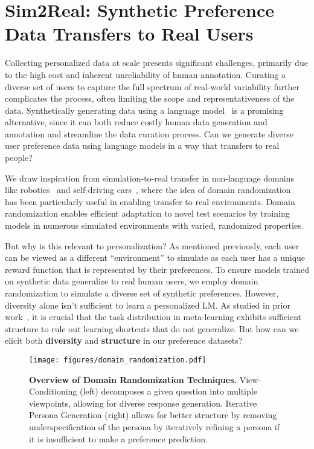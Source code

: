 
\vspace{-0.15cm}
\section{Sim2Real: Synthetic Preference Data Transfers to Real Users}
\vspace{-0.15cm}
\label{sec:dom_rand}

Collecting personalized data at scale presents significant challenges, primarily due to the high cost and inherent unreliability of human annotation. Curating a diverse set of users to capture the full spectrum of real-world variability further complicates the process, often limiting the scope and representativeness of the data. Synthetically generating data using a language model~\citep{li2024syntheticdataalmostscratch,bai2022constitutionalaiharmlessnessai} is a promising alternative, since it can both reduce costly human data generation and annotation and streamline the data curation process. Can we generate diverse user preference data using language models in a way that transfers to real people?

We draw inspiration from simulation-to-real transfer in non-language domains like robotics~\citep{makoviychuk2021isaacgymhighperformance} and self-driving cars~\citep{yang2023unisimneuralclosedloopsensor}, where the idea of domain randomization~\citep{tobin2018domainrandomizationgenerativemodels} has been particularly useful in enabling transfer to real environments. Domain randomization enables efficient adaptation to novel test scenarios by training models in numerous simulated environments with varied, randomized properties.

But why is this relevant to personalization? As mentioned previously, each user can be viewed as a different ``environment'' to simulate as each user has a unique reward function that is represented by their preferences. To ensure models trained on synthetic data generalize to real human users, we employ domain randomization to simulate a diverse set of synthetic preferences. However, diversity alone isn't sufficient to learn a personalized LM. As studied in prior work~\citep{hsu2019unsupervised,yin2019meta}, it is crucial that the task distribution in meta-learning exhibits sufficient structure to rule out learning shortcuts that do not generalize. But how can we elicit both \textbf{diversity} and \textbf{structure} in our preference datasets?


\begin{figure*}
    \centering
    \texttt{[image: figures/domain\_randomization.pdf]}
    \caption{\footnotesize\textbf{Overview of Domain Randomization Techniques.} View-Conditioning (left) decomposes a given question into multiple viewpoints, allowing for diverse response generation. Iterative Persona Generation (right) allows for better structure by removing underspecification of the persona by iteratively refining a persona if it is insufficient to make a preference prediction.}
    \label{fig:dom-rand}
    \vspace{-0.6cm}
\end{figure*}

